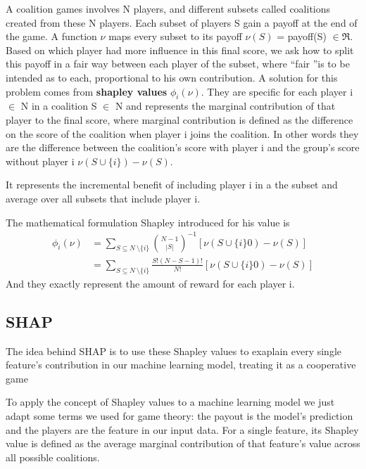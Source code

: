 \documentclass[a4paper,11pt]{article}
\begin{document}
A coalition games involves N players, and different subsets called coalitions created from these N players.
Each subset of players S gain a payoff at the end of the game.
A function $\nu$ maps every subset to its payoff $\nu(S)$ = payoff(S) $\in \Re$.
Based on which player had more influence in this final score, we ask how to split this payoff in a fair way between each player of the subset, where \textquotedblleft fair \textquotedblright is to be intended as to each, proportional to his own contribution.
A solution for this problem comes from \textbf{shapley values} $\phi_i(\nu)$.
They are specific for each player i $\in$ N in a coalition S $\in$ N and represents the marginal contribution of that player to the final score, where marginal contribution is defined as the difference on the score of the coalition when player i joins the coalition.
In other words they are the difference between the coalition's score with player i and the group's score without player i $\nu (S \cup \{ i \}) - \nu(S)$.

It represents the incremental benefit of including player i in a the subset and average over all subsets that include player i.


The mathematical formulation Shapley introduced for his value is
\begin{equation}
\begin{aligned}
\phi_i(\nu)  & = \sum_{S\subseteq N\ \setminus \{ i \} }  {N- 1 \choose |S|}^{-1} [\nu (S \cup \{ i \} 0) - \nu(S)] \\
& = \sum_{S\subseteq N\ \setminus \{ i \} }  \frac{S! (N-S-1)!}{N!} [\nu (S \cup \{ i \} 0) - \nu(S) ]
\end{aligned}
\end{equation}
And they exactly represent the amount of reward for each player i.

\subsection{SHAP}

The idea behind SHAP is to use these Shapley values to exaplain every single feature's contribution in our machine learning model, treating it as a cooperative game

To apply the concept of Shapley values to a machine learning model we just adapt some terms we used for game theory: the payout is the model's prediction and the players are the feature in our input data.
For a single feature, its Shapley value is defined as the average marginal contribution of that feature's value across all possible coalitions.
\end{document}
